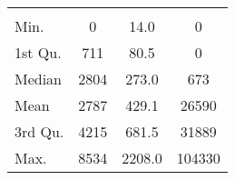 \begin{tabular}{lS[table-format=5.1]S[table-format=5.1]S[table-format=5.1]}
&  &  &  \\
 Min.    & 0 & 14.0 & 0 \\
 1st Qu. & 711 & 80.5 & 0 \\
 Median  & 2804 & 273.0 & 673 \\
 Mean    & 2787 & 429.1 & 26590 \\
 3rd Qu. & 4215 & 681.5 & 31889 \\
 Max.    & 8534 & 2208.0 & 104330 \\
\end{tabular}
